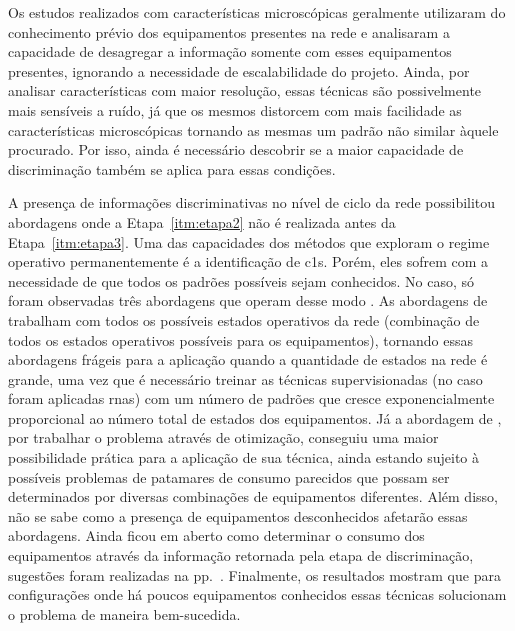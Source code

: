 Os estudos realizados com características microscópicas geralmente
utilizaram do conhecimento prévio dos equipamentos presentes na rede e
analisaram a capacidade de desagregar a informação somente com esses
equipamentos presentes, ignorando a necessidade de escalabilidade do
projeto. Ainda, por analisar características com maior resolução,
essas técnicas são possivelmente mais sensíveis a ruído, já que os
mesmos distorcem com mais facilidade as características microscópicas
tornando as mesmas um padrão não similar àquele procurado. Por isso,
ainda é necessário descobrir se a maior capacidade de discriminação
também se aplica para essas condições.

A presença de informações discriminativas no nível de ciclo da rede
possibilitou abordagens onde a Etapa~\ref{itm:etapa2} não é realizada
antes da Etapa~\ref{itm:etapa3}. Uma das capacidades dos métodos que
exploram o regime operativo permanentemente é a identificação de
\glspl{c1}. Porém, eles sofrem com a necessidade de que todos os
padrões possíveis sejam conhecidos. No caso, só foram observadas três
abordagens que operam desse modo \cite{nilm_srinivasan_nn_2006_27,
nilm_itajuba_rodrigues,nilm_suzuki_2011_35}. As abordagens de
\cite{nilm_srinivasan_nn_2006_27,nilm_itajuba_rodrigues} trabalham com
todos os possíveis estados operativos da rede (combinação de todos os
estados operativos possíveis para os equipamentos), tornando essas
abordagens frágeis para a aplicação quando a quantidade de estados na
rede é grande, uma vez que é necessário treinar as técnicas
supervisionadas (no caso foram aplicadas \glspl{rna}) com um número de
padrões que cresce exponencialmente proporcional ao número total de
estados dos equipamentos. Já a abordagem de \cite{nilm_suzuki_2011_35},
por trabalhar o problema através de otimização, conseguiu uma maior
possibilidade prática para a aplicação de sua técnica, ainda estando
sujeito à possíveis problemas de patamares de consumo parecidos que
possam ser determinados por diversas combinações de equipamentos
diferentes. Além disso, não se sabe como a presença de equipamentos
desconhecidos afetarão essas abordagens. Ainda ficou em aberto como
determinar o consumo dos equipamentos através da informação retornada
pela etapa de discriminação, sugestões foram realizadas na
pp.~\pageref{text:transf_info_discr_energia}.  Finalmente, os
resultados mostram que para configurações onde há poucos equipamentos
conhecidos essas técnicas solucionam o problema de maneira bem-sucedida.


